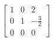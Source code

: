 \[
  \left[
  \begin{array}{ccc}
	  1 & 0 & 2 \\
	  0 & 1 & -\frac{3}{2} \\
	  0 & 0 & 0
  \end{array}
  \right]
  \]
